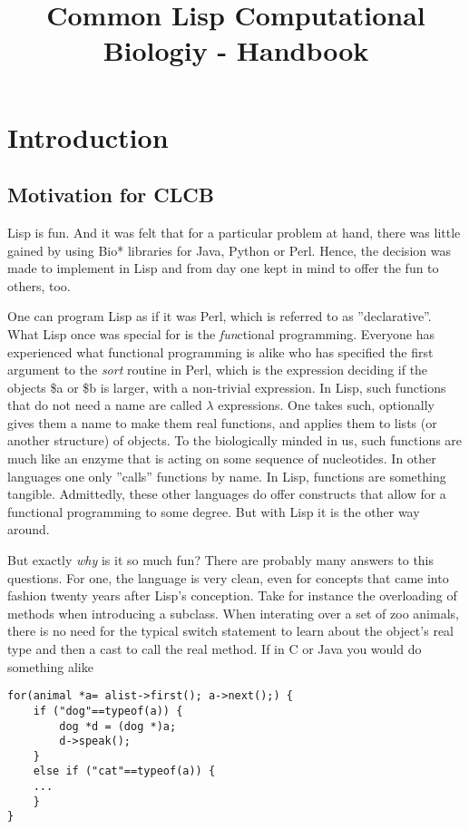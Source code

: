 \documentclass{book}
\title{Common Lisp Computational Biologiy - Handbook}
\newcommand\CLCB{CLCB }
\begin{document}
\titlepage

\chapter{Introduction}


\section{Motivation for \CLCB}

Lisp is fun. And it was felt that for a particular problem at hand, 
there was little gained by using Bio* libraries for Java, Python or Perl.
Hence, the decision was made to implement in Lisp and from day one kept in
mind to offer the fun to others, too.

One can program Lisp as if it was Perl, which is referred to as
''declarative''. What Lisp once was special for is the {\em fun}ctional
programming. Everyone has experienced what functional programming is alike
who has specified the first argument to the {\em sort} routine in Perl,
which is the expression deciding if the objects \$a or \$b is larger, with
a non-trivial expression.  In Lisp,
such functions that do not need a name are called $\lambda$ expressions.
One takes such, optionally gives them a name to make them real functions,
and applies them to lists (or another structure) of objects. To the
biologically minded in us, such functions are much like an enzyme
that is acting on some sequence of nucleotides. In other languages
one only ''calls'' functions by name. In Lisp, functions are something
tangible. Admittedly, these other languages do offer constructs that
allow for a functional programming to some degree. But with Lisp it is
the other way around.

But exactly {\em why} is it so much fun? There are probably many answers
to this questions.  For one, the language is very clean, even for concepts
that came into fashion twenty years after Lisp's conception. Take
for instance the overloading of methods when introducing a subclass.
When interating over a set of zoo animals, there is no need for the
typical switch statement to learn about the object's real type and then a
cast to call the real method. If in C or Java you would do something alike

\lstset{language=C}
\begin{lstlisting}
for(animal *a= alist->first(); a->next();) {
	if ("dog"==typeof(a)) {
		dog *d = (dog *)a;
		d->speak();
	}
	else if ("cat"==typeof(a)) {
	...
	}
}
\end{lstlisting}
\end{document}
